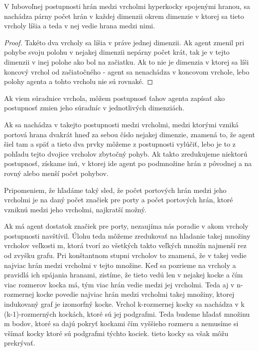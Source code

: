 \begin{veta}
V ľubovoľnej postupnosti hrán medzi vrcholmi hyperkocky spojenými hranou, sa
nachádza párny počet hrán v každej dimenzii okrem dimenzie v ktorej sa tieto
vrcholy líšia a teda v nej vedie hrana medzi nimi.
\end{veta}
\begin{proof}
Takéto dva vrcholy sa líšia v práve jednej dimenzii. Ak agent zmenil pri 
pohybe svoju polohu v nejakej dimenzii nepárny počet 
krát, tak je v tejto dimenzii v inej polohe ako bol na začiatku. Ak to nie je 
dimenzia v ktorej sa líši koncový vrchol od začiatočného - agent sa
nenachádza v koncovom vrchole, lebo polohy agenta a tohto vrcholu nie sú
rovnaké.
\end{proof}

\begin{ozn}
Ak viem súradnice vrchola, môžem postupnosť ťahov agenta zapísať ako postupnosť 
zmien jeho súradníc v jednotlivých dimenziách. 
\end{ozn}
Ak sa nachádza v takejto postupnosti medzi
vrcholmi, medzi ktorými vzniká portová hrana dvakrát hneď za sebou číslo
nejakej dimenzie, znamená to, že agent šiel tam a späť a tieto dva prvky
môžeme z postupnosti vylúčiť, lebo je to z pohľadu tejto dvojice vrcholov
zbytočný pohyb. Ak takto zredukujeme niektorú postupnosť, získame inú, v
ktorej ide agent po podmnožine hrán z pôvodnej a na rovný alebo menší počet
pohybov.
\begin{pozn}
Pripomeniem, že hľadáme taký sled, že počet portových hrán medzi jeho
vrcholmi je na daný počet značiek pre porty a počet portových hrán, ktoré
vzniknú medzi jeho vrcholmi, najkratší možný.
\end{pozn}

Ak má agent dostatok značiek pre porty, nezaujíma nás poradie v akom vrcholy
postupnosti navštívil. Úlohu teda môžeme zredukovať na hľadanie takej množiny
vrcholov veľkosti m, ktorá tvorí zo všetkých takto veľkých množín najmenší rez
od zvyšku grafu. Pri konštantnom stupni vrcholov to znamená, že v takej vedie 
najviac hrán medzi vrcholmi v tejto množine.
Keď sa pozrieme na vrcholy a pravidlá ich spájania hranami, zistíme, že
tieto vedú len v nejakej kocke a čím viac rozmerov kocka má, tým viac hrán
vedie medzi jej vrcholmi. Teda aj v n-rozmernej kocke povedie najviac hrán
medzi vrcholmi takej množiny, ktorej indukovaný graf je izomorfný kocke.
Vrchol k-rozmernej kocky sa nachádza v k (k-1)-rozmerných kockách, ktoré sú
jej podgrafmi. Teda budeme hľadať množinu m bodov, ktoré sa dajú
pokryť kockami čím vyššieho rozmeru a nemusíme si všímať kocky ktoré sú
podgrafmi týchto kociek. tieto kocky sa však môžu prekrývať.

